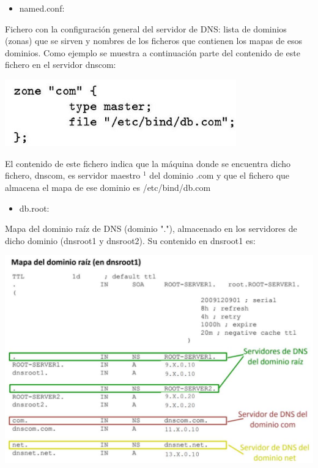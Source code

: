 \documentclass[12pt, a4paper]{report}
\begin{document}
\begin{itemize}
  \item named.conf:
\end{itemize}

Fichero con la configuración general del servidor de DNS: lista de dominios (zonas) que se sirven y nombres de los ficheros que contienen los mapas de esos dominios. Como ejemplo se muestra a continuación parte del contenido de este fichero en el servidor dnscom:

\begin{center}
\includegraphics[width=100mm]{2022_12_15_5d692d3f6b88770a0becg-3}
\end{center}

El contenido de este fichero indica que la máquina donde se encuentra dicho fichero, dnscom, es servidor maestro $^{1}$ del dominio .com y que el fichero que almacena el mapa de ese dominio es /etc/bind/db.com

\begin{itemize}
  \item db.root:
\end{itemize}

Mapa del dominio raíz de DNS (dominio "."), almacenado en los servidores de dicho dominio (dnsroot1 y dnsroot2). Su contenido en dnsroot1 es:

\begin{center}
\includegraphics[width=\textwidth]{2022_12_15_5d692d3f6b88770a0becg-3(1)}
\end{center}
\end{document}
